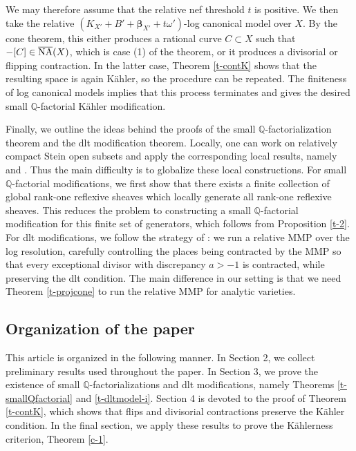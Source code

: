 \documentclass[11pt]{amsart}
\numberwithin{equation}{section}
\def\bbeta{\boldsymbol{\beta}}
\newcommand\Q{{\mathbb{Q}}}
\theoremstyle{definition}
\theoremstyle{definition}
\theoremstyle{definition}
\begin{document}
We may therefore assume that the relative nef threshold $t$ is positive. We then take the relative $(K_{X'}+B'+\bbeta_{X'}+t\omega')$-log canonical model over $X$. By the cone theorem, this either produces a rational curve $C\subset X$ such that $
-[C]\in \overline{\rm NA}(X)$, 
which is case (1) of the theorem, or it produces a divisorial or flipping contraction. In the latter case, Theorem \ref{t-contK} shows that the resulting space is again K\"ahler, so the procedure can be repeated. The finiteness of log canonical models \cite[Theorem E]{Fuj22} implies that this process terminates and gives the desired small $\Q$-factorial K\"ahler modification.

Finally, we outline the ideas behind the proofs of the small $\mathbb{Q}$-factorialization theorem and the dlt modification theorem. Locally, one can work on relatively compact Stein open subsets and apply the corresponding local results, namely \cite[Theorem 2.19]{DHY23} and \cite[Theorem 1.6]{HP24}. Thus the main difficulty is to globalize these local constructions. For small $\Q$-factorial modifications, we first show that there exists a finite collection of global rank-one reflexive sheaves which locally generate all rank-one reflexive sheaves. This reduces the problem to constructing a small $\Q$-factorial modification for this finite set of generators, which follows from Proposition \ref{t-2}. For dlt modifications, we follow the strategy of \cite{Fil20}: we run a relative MMP over the log resolution, carefully controlling the places being contracted by the MMP so that every exceptional divisor with discrepancy $a>-1$ is contracted, while preserving the dlt condition. The main difference in our setting is that we need Theorem \ref{t-projcone} to run the relative MMP for analytic varieties.


\subsection{Organization of the paper}

This article is organized in the following manner. In Section 2, we collect preliminary results used throughout the paper. In Section 3, we prove the existence of small $\Q$-factorializations and dlt modifications, namely Theorems \ref{t-smallQfactorial} and \ref{t-dltmodel-i}. Section 4 is devoted to the proof of Theorem \ref{t-contK}, which shows that flips and divisorial contractions preserve the K\"ahler condition. In the final section, we apply these results to prove the K\"ahlerness criterion, Theorem \ref{c-1}.
\end{document}
